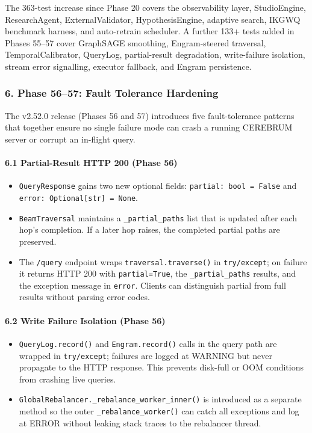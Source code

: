 The 363-test increase since Phase 20 covers the obser\-vability layer, StudioEngine, ResearchAgent, ExternalValidator, HypothesisEngine, adaptive search, IKGWQ benchmark harness, and auto-retrain scheduler. A further 133+ tests added in Phases 55–57 cover GraphSAGE smoothing, Engram-steered traversal, TemporalCalibrator, QueryLog, partial-result degradation, write-failure isolation, stream error signalling, executor fallback, and Engram persistence.

\subsubsection{6. Phase 56–57: Fault Tolerance Hardening}

The v2.52.0 release (Phases 56 and 57) introduces five fault-tolerance patterns that together ensure no single failure mode can crash a running CEREBRUM server or corrupt an in-flight query.

\paragraph{6.1 Partial-Result HTTP 200 (Phase 56)}
\begin{itemize}
\item \texttt{QueryResponse} gains two new optional fields: \texttt{partial: bool = False} and \texttt{error: Optional[str] = None}.
\item \texttt{BeamTraversal} maintains a \texttt{\_partial\_paths} list that is updated after each hop's completion. If a later hop raises, the completed partial paths are preserved.
\item The \texttt{/query} endpoint wraps \texttt{traversal.traverse()} in \texttt{try/except}; on failure it returns HTTP 200 with \texttt{partial=True}, the \texttt{\_partial\_paths} results, and the exception message in \texttt{error}. Clients can distinguish partial from full results without parsing error codes.

\end{itemize}
\paragraph{6.2 Write Failure Isolation (Phase 56)}
\begin{itemize}
\item \texttt{QueryLog.record()} and \texttt{Engram.record()} calls in the query path are wrapped in \texttt{try/except}; failures are logged at WARNING but never propagate to the HTTP response. This prevents disk-full or OOM conditions from crashing live queries.
\item \texttt{GlobalRebalancer.\_rebalance\_worker\_inner()} is introduced as a separate method so the outer \texttt{\_rebalance\_worker()} can catch all exceptions and log at ERROR without leaking stack traces to the rebalancer thread.

\end{itemize}
